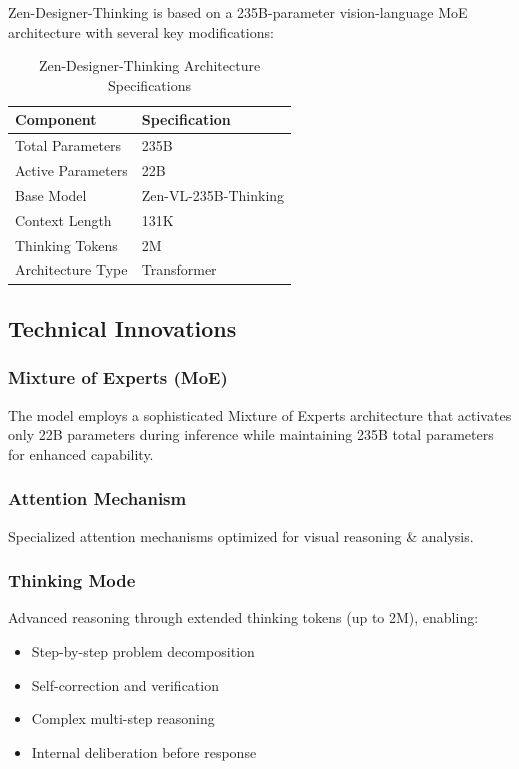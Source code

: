 \documentclass[11pt,a4paper]{article}
\begin{document}
Zen-Designer-Thinking is based on a 235B-parameter vision-language MoE architecture with several key modifications:

\begin{table}[H]
\centering
\begin{tabular}{ll}
\toprule
\textbf{Component} & \textbf{Specification} \\
\midrule
Total Parameters & 235B \\
Active Parameters & 22B \\
Base Model & Zen-VL-235B-Thinking \\
Context Length & 131K \\
Thinking Tokens & 2M \\

Architecture Type & Transformer \\
\bottomrule
\end{tabular}
\caption{Zen-Designer-Thinking Architecture Specifications}
\end{table}

\subsection{Technical Innovations}

\subsubsection{Mixture of Experts (MoE)}
The model employs a sophisticated Mixture of Experts architecture that activates only 22B parameters 
during inference while maintaining 235B total parameters for enhanced capability.

\subsubsection{Attention Mechanism}
Specialized attention mechanisms optimized for visual reasoning \& analysis.

\subsubsection{Thinking Mode}
Advanced reasoning through extended thinking tokens (up to 2M), enabling:
\begin{itemize}
    \item Step-by-step problem decomposition
    \item Self-correction and verification
    \item Complex multi-step reasoning
    \item Internal deliberation before response
\end{itemize}
\end{document}
